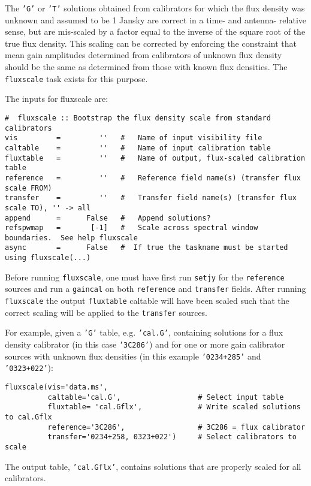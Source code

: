 The {\tt 'G'} or {\tt 'T'} solutions obtained from calibrators for
which the flux 
density was unknown and assumed to be 1 Jansky are correct in a time- and
antenna- relative sense, but are mis-scaled by a factor equal to the
inverse of the square root of the true flux density.  This scaling can
be corrected by enforcing the constraint that mean gain amplitudes
determined from calibrators of unknown flux density should be the same
as determined from those with known flux densities.  The {\tt
fluxscale} task exists for this purpose.  

The inputs for fluxscale are:
\small
\begin{verbatim}
#  fluxscale :: Bootstrap the flux density scale from standard calibrators
vis         =         ''   #   Name of input visibility file
caltable    =         ''   #   Name of input calibration table
fluxtable   =         ''   #   Name of output, flux-scaled calibration table
reference   =         ''   #   Reference field name(s) (transfer flux scale FROM)
transfer    =         ''   #   Transfer field name(s) (transfer flux scale TO), '' -> all
append      =      False   #   Append solutions?
refspwmap   =       [-1]   #   Scale across spectral window boundaries.  See help fluxscale
async       =      False   #  If true the taskname must be started using fluxscale(...)
\end{verbatim}
\normalsize

Before running {\tt fluxscale}, one must have first run {\tt setjy} for the
{\tt reference} sources and run a {\tt gaincal} on both {\tt reference}
and {\tt transfer} fields.  After running {\tt fluxscale} the output
{\tt fluxtable} caltable will have been scaled such that the correct
scaling will be applied to the {\tt transfer} sources.

For example, given a {\tt 'G'} table, e.g. {\tt 'cal.G'},
containing solutions for a flux density calibrator (in this case 
{\tt '3C286'}) and for one or more gain calibrator sources with
unknown flux densities (in this example {\tt '0234+285'} and 
{\tt '0323+022'}):
\small
\begin{verbatim}
fluxscale(vis='data.ms',
          caltable='cal.G',                  # Select input table
          fluxtable= 'cal.Gflx',             # Write scaled solutions to cal.Gflx
          reference='3C286',                 # 3C286 = flux calibrator
          transfer='0234+258, 0323+022')     # Select calibrators to scale
\end{verbatim}
\normalsize
The output table, {\tt 'cal.Gflx'}, contains solutions that are properly scaled
for all calibrators.

